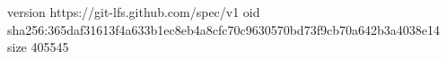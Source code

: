 version https://git-lfs.github.com/spec/v1
oid sha256:365daf31613f4a633b1ec8eb4a8cfc70c9630570bd73f9cb70a642b3a4038e14
size 405545
